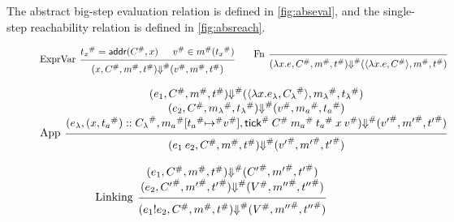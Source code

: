 \documentclass[acmsmall,review]{acmart}\settopmatter{printfolios=true,printccs=false,printacmref=false}
\theoremstyle{definition}
\newcommand*{\cons}{::}
\newcommand*{\A}[1]{{#1}^{\#}}
\newcommand*{\mem}{m}
\newcommand*{\link}[2]{{#1}\mathtt{!}{#2}}
\newcommand*{\addr}{\mathsf{addr}}
\newcommand*{\tick}{\mathsf{tick}}
\begin{document}
The abstract big-step evaluation relation is defined in \ref{fig:abseval}, and the single-step reachability relation is defined in \ref{fig:absreach}.

\begin{figure}[h!]
  \begin{flushright}\fbox{$(e,\A{C},\A\mem,\A{t})\A\Downarrow(\A{V},\A{\mem'},\A{t'})$}\end{flushright}
  \footnotesize
  \[
    \begin{prooftree}
      \hypo{\A{t_{x}}=\addr(\A{C},x)}
      \hypo{\A{v}\in\A{\mem}(\A{t_{x}})}
      \infer[left label=ExprVar]2{
      (x, \A{C}, \A{\mem}, \A{t})
      \A{\Downarrow}
      (\A{v}, \A{\mem}, \A{t})
      }
    \end{prooftree}\qquad
    \begin{prooftree}
      \infer[left label=Fn]0{
      (\lambda x.e, \A{C}, \A{\mem}, \A{t})
      \A{\Downarrow}
      (\langle\lambda x.e, \A{C}\rangle, \A{\mem}, \A{t})
      }
    \end{prooftree}
  \]

  \[
    \begin{prooftree}
      \hypo{
        \begin{matrix}
          (e_{1}, \A{C}, \A{\mem}, \A{t})
          \A{\Downarrow}
          (\langle\lambda x.e_{\lambda}, \A{C_{\lambda}}\rangle, \A{\mem_{\lambda}}, \A{t_{\lambda}}) \\
          (e_{2}, \A{C}, \A{\mem_{\lambda}}, \A{t_{\lambda}})
          \A{\Downarrow}
          (\A{v}, \A{\mem_{a}}, \A{t_{a}})                                                            \\
          (e_{\lambda}, (x, \A{t_a})\cons \A{C_{\lambda}}, \A{\mem_{a}}[\A{t_{a}}\A{\mapsto} \A{v}], \A{\tick}\:\A{C}\:\A{\mem_a}\:\A{t_{a}}\:x\:\A{v})
          \A{\Downarrow}
          (\A{v'}, \A{\mem'},\A{t'})
        \end{matrix}
      }
      \infer[left label={App}]1{
      (e_{1}\:e_{2}, \A{C}, \A{\mem}, \A{t})
      \A{\Downarrow}
      (\A{v'}, \A{\mem'},\A{t'})
      }
    \end{prooftree}
  \]

  \[
    \begin{prooftree}
      \hypo{
        \begin{matrix}
          (e_{1}, \A{C}, \A{\mem}, \A{t})
          \A{\Downarrow}
          (\A{C'}, \A{\mem'}, \A{t'}) \\
          (e_{2}, \A{C'}, \A{\mem'}, \A{t'})
          \A{\Downarrow}
          (\A{V}, \A{\mem''}, \A{t''})
        \end{matrix}
      }
      \infer[left label=Linking]1{
      (\link{e_{1}}{e_{2}}, \A{C}, \A{\mem}, \A{t})
      \A\Downarrow
      (\A{V}, \A{\mem''}, \A{t''})
      }
    \end{prooftree}
  \]


\end{figure}
\end{document}
